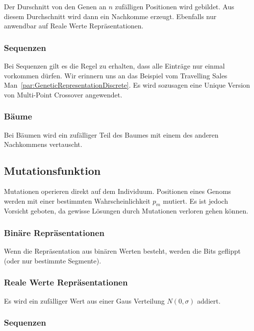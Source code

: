           Der Durschnitt von den Genen an \(n\) zufälligen Positionen wird gebildet.
          Aus diesem Durchschnitt wird dann ein Nachkomme erzeugt.
          Ebenfalls nur anwendbar auf Reale Werte Repräsentationen.

        \subsubsection{Sequenzen}

          Bei Sequenzen gilt es die Regel zu erhalten, dass alle Einträge nur einmal vorkommen dürfen.
          Wir erinnern uns an das Beispiel vom Travelling Sales Man~\vref{par:GeneticRepresentationDiscrete}.
          Es wird sozusagen eine Unique Version von  Multi-Point Crossover angewendet.

        \subsubsection{Bäume}

          Bei Bäumen wird ein zufälliger Teil des Baumes mit einem des anderen Nachkommens vertauscht.

    \subsection{Mutationsfunktion}

      Mutationen operieren direkt auf dem Individuum.
      Positionen eines Genoms werden mit einer bestimmten Wahrscheinlichkeit \(p_{m}\) mutiert.
      Es ist jedoch Vorsicht geboten, da gewisse Lösungen durch Mutationen verloren gehen können.

      \subsubsection{Binäre Repräsentationen}

        Wenn die Repräsentation aus binären Werten besteht, werden die Bits geflippt (oder nur bestimmte Segmente).

      \subsubsection{Reale Werte Repräsentationen}

        Es wird ein zufälliger Wert aus einer Gaus Verteilung \(N(0,\sigma)\) addiert.

      \subsubsection{Sequenzen}

